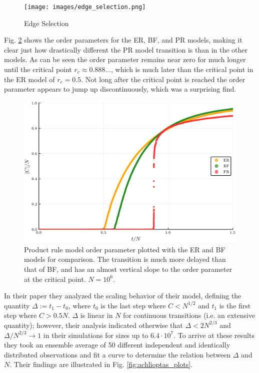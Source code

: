 \begin{figure}[H]
	\centering
	\texttt{[image: images/edge\_selection.png]}
	\caption{Edge Selection}
	\label{fig:edge_selection}
\end{figure}

Fig. \ref{fig:ER_BF_PR_transition} shows the order parameters for the ER, BF, and PR models, making it clear just how drastically different the PR model transition is than in the other models.
As can be seen the order parameter remains near zero for much longer until the critical point $r_c \approx 0.888...$, which is much later than the critical point in the ER model of $r_c = 0.5$.
Not long after the critical point is reached the order parameter appears to jump up discontinuously, which was a surprising find.

\begin{figure}[H]
	\centering
	\includegraphics[width=350pt]{images/Network_ER_BF_PR_1e6_order_param.png}
	\caption{Product rule model order parameter plotted with the ER and BF models for comparison. The transition is much more delayed than that of BF, and has an almost vertical slope to the order parameter at the critical point. $N = 10^6$.}
	\label{fig:ER_BF_PR_transition}
\end{figure}

In their paper they analyzed the scaling behavior of their model, defining the quantity $\Delta := t_1 - t_0$, where $t_0$ is the last step where $C < N^{1/2}$ and $t_1$ is the first step where $C > 0.5N$.
$\Delta$ is linear in $N$ for continuous transitions (i.e. an extensive quantity); however, their analysis indicated otherwise that $\Delta < 2N^{2/3}$ and $\Delta / N^{2/3} \rightarrow 1$ in their simulations for sizes up to $6.4 \cdot 10^7$.
To arrive at these results they took an ensemble average of 50 different independent and identically distributed observations and fit a curve to determine the relation between $\Delta$ and $N$.
Their findings are illustrated in Fig. \ref{fig:achlioptas_plots}.

